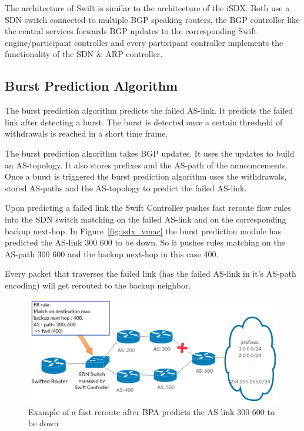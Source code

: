 The architecture of Swift is similar to the architecture of the iSDX. Both use a SDN switch connected to multiple BGP speaking routers, the BGP controller like the central services forwards BGP updates to the corresponding Swift engine/participant controller and every participant controller implements the functionality of the SDN \& ARP controller. 

\subsection{\label{chapter2:Swift:BPA}Burst Prediction Algorithm}
The burst prediction algorithm predicts the failed AS-link. It predicts the failed link after detecting a burst. The burst is detected once a certain threshold of withdrawals is reached in a short time frame. 

The burst prediction algorithm takes BGP updates. It uses the updates to build an AS-topology. It also stores prefixes and the AS-path of the announcements. Once a burst is triggered the burst prediction algorithm uses the withdrawals, stored AS-paths and the AS-topology to predict the failed AS-link.

Upon predicting a failed link the Swift Controller pushes fast reroute flow rules into the SDN switch matching on the failed AS-link and on the corresponding backup next-hop. In Figure~\ref{fig:isdx_vmac} the burst prediction module has predicted the AS-link 300 600 to be down. So it pushes rules matching on the AS-path 300 600 and the backup next-hop in this case 400.

Every packet that traverses the failed link (has the failed AS-link in it's AS-path encoding) will get rerouted to the backup neighbor.
\begin{figure}[h]
\center
\includegraphics[scale = 0.36]{Figures/bckgrnd_swift_fr.pdf}
\caption{Example of a fast reroute after BPA predicts the AS link 300 600 to be down}
\label{fig:swift_FR}
\end{figure}

